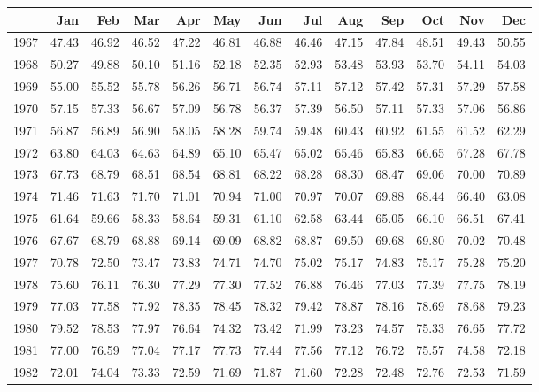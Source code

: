 \begin{longtable}{rrrrrrrrrrrrr}
  \hline
 & Jan & Feb & Mar & Apr & May & Jun & Jul & Aug & Sep & Oct & Nov & Dec \\ 
  \hline
1967 & 47.43 & 46.92 & 46.52 & 47.22 & 46.81 & 46.88 & 46.46 & 47.15 & 47.84 & 48.51 & 49.43 & 50.55 \\ 
  1968 & 50.27 & 49.88 & 50.10 & 51.16 & 52.18 & 52.35 & 52.93 & 53.48 & 53.93 & 53.70 & 54.11 & 54.03 \\ 
  1969 & 55.00 & 55.52 & 55.78 & 56.26 & 56.71 & 56.74 & 57.11 & 57.12 & 57.42 & 57.31 & 57.29 & 57.58 \\ 
  1970 & 57.15 & 57.33 & 56.67 & 57.09 & 56.78 & 56.37 & 57.39 & 56.50 & 57.11 & 57.33 & 57.06 & 56.86 \\ 
  1971 & 56.87 & 56.89 & 56.90 & 58.05 & 58.28 & 59.74 & 59.48 & 60.43 & 60.92 & 61.55 & 61.52 & 62.29 \\ 
  1972 & 63.80 & 64.03 & 64.63 & 64.89 & 65.10 & 65.47 & 65.02 & 65.46 & 65.83 & 66.65 & 67.28 & 67.78 \\ 
  1973 & 67.73 & 68.79 & 68.51 & 68.54 & 68.81 & 68.22 & 68.28 & 68.30 & 68.47 & 69.06 & 70.00 & 70.89 \\ 
  1974 & 71.46 & 71.63 & 71.70 & 71.01 & 70.94 & 71.00 & 70.97 & 70.07 & 69.88 & 68.44 & 66.40 & 63.08 \\ 
  1975 & 61.64 & 59.66 & 58.33 & 58.64 & 59.31 & 61.10 & 62.58 & 63.44 & 65.05 & 66.10 & 66.51 & 67.41 \\ 
  1976 & 67.67 & 68.79 & 68.88 & 69.14 & 69.09 & 68.82 & 68.87 & 69.50 & 69.68 & 69.80 & 70.02 & 70.48 \\ 
  1977 & 70.78 & 72.50 & 73.47 & 73.83 & 74.71 & 74.70 & 75.02 & 75.17 & 74.83 & 75.17 & 75.28 & 75.20 \\ 
  1978 & 75.60 & 76.11 & 76.30 & 77.29 & 77.30 & 77.52 & 76.88 & 76.46 & 77.03 & 77.39 & 77.75 & 78.19 \\ 
  1979 & 77.03 & 77.58 & 77.92 & 78.35 & 78.45 & 78.32 & 79.42 & 78.87 & 78.16 & 78.69 & 78.68 & 79.23 \\ 
  1980 & 79.52 & 78.53 & 77.97 & 76.64 & 74.32 & 73.42 & 71.99 & 73.23 & 74.57 & 75.33 & 76.65 & 77.72 \\ 
  1981 & 77.00 & 76.59 & 77.04 & 77.17 & 77.73 & 77.44 & 77.56 & 77.12 & 76.72 & 75.57 & 74.58 & 72.18 \\ 
  1982 & 72.01 & 74.04 & 73.33 & 72.59 & 71.69 & 71.87 & 71.60 & 72.28 & 72.48 & 72.76 & 72.53 & 71.59 \\ 

\end{longtable}
